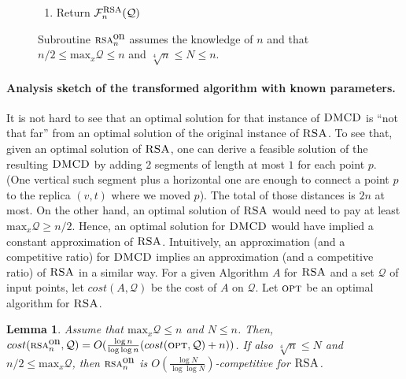 \documentclass[11pt]{article}
\newtheorem{lem}[theorem]{Lemma}
\newcommand{\DMCD}{\mbox{\sc DMCD}}
\newcommand{\RSA}{\mbox{\sc RSA}}
\newcommand{\cost}[0]{cost}
\newcommand{\calV}{\mathcal{V}}
\newcommand{\calF}{\mathcal{F}}
\newcommand{\calQ}{\mathcal{Q}}
\newcommand{\calP}{\mathcal{P}}
\newcommand{\opt}{\mbox{\textsc{opt}}}
\newcommand{\onRSAn}{\mbox{\sc rsa}^{\mbox{\upshape on}}_{\nn}}
\newcommand{\xmaxQ}[0]{\mbox{max}_x\calQ}
\newcommand{\linev}[1]{L_{ver}\langle #1\rangle}
\newcommand{\lineh}[1]{L_{hor}\langle #1\rangle}
\newcommand{\NN}{N}
\newcommand{\nn}{n}
\newcommand{\uon}{u^{\mbox{\upshape on}}}
\newcommand{\PVon}[0]{\calP_\calV^{\mbox{\upshape\small on}}}
\newcommand{\loglogratio}[1]{\frac{\log #1}{\log\log #1}}
\newcommand{\FRSAn}[0]{\calF^{\mbox{\sc rsa}}_{\nn}}
\begin{document}
{\begin{figure}[ht!]
{\begin{minipage}{0.8\textwidth}
\begin{enumerate}
\begin{enumerate}
\begin{enumerate}
    \item $\FRSAn\leftarrow\FRSAn\cup\{\lineh{({\uon_i},y_i),({v_i},y_i)}\}$.


    \item $\FRSAn\leftarrow\FRSAn\cup\{\lineh{({v_i},y_i),(x_i,y_i)}\}$

\item $\FRSAn\leftarrow\FRSAn\cup\{\linev{({u},y_i),({u},{t_i})} \mid (u,t_i)\in\PVon(i)\}$.

    \end{enumerate}

\end{enumerate}
\item Return $\FRSAn(\calQ)$
\end{enumerate}
\end{minipage}
}
\caption{\label{figure: onRSAn}
Subroutine $\onRSAn$ assumes the knowledge of $n$ and that $\nn/2\leq\xmaxQ\leq \nn$ and $\sqrt[4]{\nn}\leq \NN\leq \nn$.
}
\end{figure}

} \FigCodeOnRSAn



\paragraph*{\bf Analysis sketch of the transformed algorithm with known parameters\commsingle.\commsingleend}



It is not hard to see that an optimal solution for that instance of $\DMCD$ is ``not that far'' from an optimal solution of the original instance of $\RSA$.
To see that, given an optimal solution of $\RSA$, one can derive a feasible solution of the resulting $\DMCD$ by adding 2 segments of length at most $1$  for each point $p$. (One vertical such segment plus a horizontal one are enough to connect a point $p$ to the replica
$(v,t)$ where we moved $p$).
 The total of those distances is $2\nn$ at most.
On the other hand, an optimal solution of $\RSA$ would need to pay at least $\xmaxQ\geq \nn/2$.
Hence, an optimal solution for $\DMCD$ would have implied a constant approximation of $\RSA$.
Intuitively, an approximation (and a competitive ratio) for $\DMCD$ implies an approximation (and a competitive ratio) of $\RSA$ in a similar way.
For a given Algorithm $A$ for $\RSA$ and a set $\calQ$ of input points, let $\cost(A,\calQ)$ be the cost of $A$ on $\calQ$.
Let $\opt$ be an optimal algorithm for $\RSA$.

\begin{lem}
Assume that $\xmaxQ\leq \nn$ and $\NN\leq \nn$.
Then, $\cost(\onRSAn,\calQ)= O(\loglogratio{n}(\cost(\opt,\calQ)+\nn))$.
If also $\sqrt[4]{\nn}\leq\NN$ and $\nn/2\leq\xmaxQ$, then $\onRSAn$ is  $O(\loglogratio{N})$-competitive for $\RSA$.
\label{lemma: onRSAn is O(sqrt log n)-competitve}
\end{lem}
\end{document}
